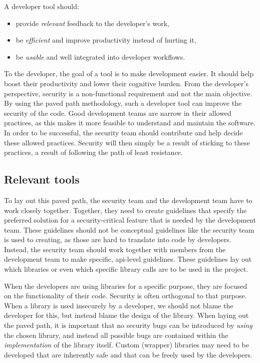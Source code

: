 A developer tool should:
\begin{itemize}[noitemsep]
    \item provide \emph{relevant} feedback to the developer's work,
    \item be \emph{efficient} and improve productivity instead of hurting it,
    \item be \emph{usable} and well integrated into developer workflows.
\end{itemize}

To the developer, the goal of a tool is to make development easier.
It should help boost their productivity and lower their cognitive burden.
From the developer's perspective, security is a non-functional requirement and not the main objective.
By using the paved path methodology, such a developer tool can improve the security of the code.
Good development teams are narrow in their allowed practices, as this makes it more feasible to understand and maintain the software.
In order to be successful, the security team should contribute and help decide these allowed practices.
Security will then simply be a result of sticking to these practices, a result of following the path of least resistance.

\subsection{Relevant tools}
To lay out this paved path, the security team and the development team have to work closely together.
Together, they need to create guidelines that specify the preferred solution for a security-critical feature that is needed by the development team.
These guidelines should not be conceptual guidelines like the security team is used to creating, as those are hard to translate into code by developers.
Instead, the security team should work together with members from the development team to make specific, \gls{api}-level guidelines.
These guidelines lay out which libraries or even which specific library calls are to be used in the project.

When the developers are using libraries for a specific purpose, they are focused on the functionality of their code. Security is often orthogonal to that purpose.
When a library is used insecurely by a developer, we should not blame the developer for this, but instead blame the design of the library.
When laying out the paved path, it is important that no security bugs can be introduced by \textit{using} the chosen library, and instead all possible bugs are contained within the \textit{implementation} of the library itself.
Custom (wrapper) libraries may need to be developed that are inherently safe and that can be freely used by the developers.

